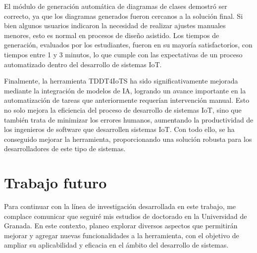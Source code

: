 El módulo de generación automática de diagramas de clases demostró ser correcto, ya que los diagramas generados fueron cercanos a la solución final. Si bien algunos usuarios indicaron la necesidad de realizar ajustes manuales menores, esto es normal en procesos de diseño asistido. Los tiempos de generación, evaluados por los estudiantes, fueron en su mayoría satisfactorios, con tiempos entre 1 y 3 minutos, lo que cumple con las expectativas de un proceso automatizado dentro del desarrollo de sistemas IoT.

Finalmente, la herramienta TDDT4IoTS ha sido significativamente mejorada mediante la integración de modelos de IA, logrando un avance importante en la automatización de tareas que anteriormente requerían intervención manual. Esto no solo mejora la eficiencia del proceso de desarrollo de sistemas IoT, sino que también trata de minimizar los errores humanos, aumentando la productividad de los ingenieros de software que desarrollen sistemas IoT. Con todo ello, se ha conseguido mejorar la herramienta, proporcionando una solución robusta para los desarrolladores de este tipo de sistemas.

\section{Trabajo futuro}

Para continuar con la línea de investigación desarrollada en este trabajo, me complace comunicar que seguiré mis estudios de doctorado en la Universidad de Granada. En este contexto, planeo explorar diversos aspectos que permitirán mejorar y agregar nuevas funcionalidades a la herramienta, con el objetivo de ampliar su aplicabilidad y eficacia en el ámbito del desarrollo de sistemas.

